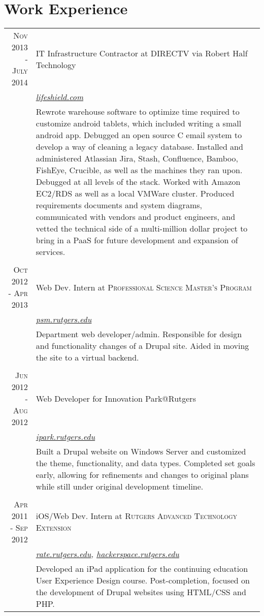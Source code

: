 \documentclass[a4paper,10pt, onepage]{article} %
\begin{document}
\section{Work Experience}
\begin{tabular}{r|p{10cm}}
\textsc{Nov 2013 - July 2014} & {IT Infrastructure Contractor at DIRECTV via Robert Half Technology}\\
&\small\emph{\href{http://lifeshield.com}{lifeshield.com}}\\
&\footnotesize{Rewrote warehouse software to optimize time required to customize android tablets, which included writing a small android app. Debugged an open source C email system to develop a way of cleaning a legacy database. Installed and administered Atlassian Jira, Stash, Confluence, Bamboo, FishEye, Crucible, as well as the machines they ran upon. Debugged at all levels of the stack. Worked with Amazon EC2/RDS as well as a local VMWare cluster. Produced requirements documents and system diagrams, communicated with vendors and product engineers, and vetted the technical side of a multi-million dollar project to bring in a PaaS for future development and expansion of services.}\\
\multicolumn{2}{c}{}\\

\textsc{Oct 2012 - Apr 2013} & Web Dev. Intern at \textsc{Professional Science Master's Program}\\
& \small\emph{\href{http://psm.rutgers.edu}{psm.rutgers.edu}}\\
& \footnotesize{Department web developer/admin. Responsible for design and functionality changes of a Drupal site. Aided in moving the site to a virtual backend.}\\
\multicolumn{2}{c}{} \\


\textsc{Jun 2012 - Aug 2012} & Web Developer for Innovation Park@Rutgers\\
& \small\emph{\href{http://ipark.rutgers.edu}{ipark.rutgers.edu}}\\
& \footnotesize{Built a Drupal website on Windows Server and customized the theme, functionality, and data types. Completed set goals early, allowing for refinements and changes to original plans while still under original development timeline.}\\
\multicolumn{2}{c}{}\\


\textsc{Apr 2011 - Sep 2012} & iOS/Web Dev. Intern at \textsc{Rutgers Advanced Technology Extension}\\
& \small\emph{\href{http://rate.rutgers.edu}{rate.rutgers.edu}, \href{http://hackerspace.rutgers.edu}{hackerspace.rutgers.edu}}\\
& \footnotesize{Developed an iPad application for the continuing education User Experience Design course. Post-completion, focused on the development of Drupal websites using HTML/CSS and PHP.}
\end{tabular}
\end{document}

